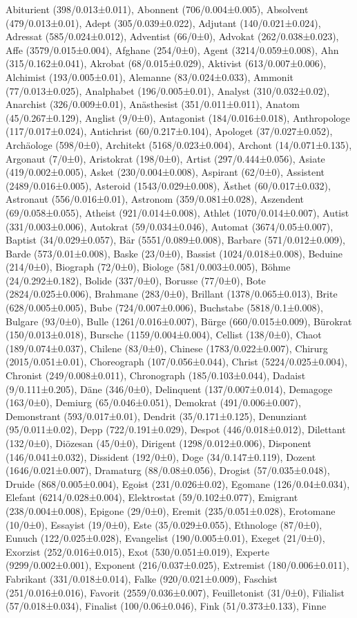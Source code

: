 \begin{styleMoutonText}
Abiturient (398/0.013±0.011), Abonnent (706/0.004±0.005), Absolvent (479/0.013±0.01), Adept (305/0.039±0.022), Adjutant (140/0.021±0.024), Adressat (585/0.024±0.012), Adventist (66/0±0), Advokat (262/0.038±0.023), Affe (3579/0.015±0.004), Afghane (254/0±0), Agent (3214/0.059±0.008), Ahn (315/0.162±0.041), Akrobat (68/0.015±0.029), Aktivist (613/0.007±0.006), Alchimist (193/0.005±0.01), Alemanne (83/0.024±0.033), Ammonit (77/0.013±0.025), Analphabet (196/0.005±0.01), Analyst (310/0.032±0.02), Anarchist (326/0.009±0.01), Anästhesist (351/0.011±0.011), Anatom (45/0.267±0.129), Anglist (9/0±0), Antagonist (184/0.016±0.018), Anthropologe (117/0.017±0.024), Antichrist (60/0.217±0.104), Apo\-loget (37/0.027±0.052), Archäologe (598/0±0), Architekt (5168/0.023±0.004), Archont (14/0.071±0.135), Argonaut (7/0±0), Aristokrat (198/0±0), Artist (297/0.444±0.056), Asiate (419/0.002±0.005), Asket (230/0.004±0.008), Aspirant (62/0±0), Assistent (2489/0.016±0.005), Asteroid (1543/0.029±0.008), Ästhet (60/0.017±0.032), Astronaut (556/0.016±0.01), Astronom (359/0.081±0.028), Aszendent (69/0.058±0.055), Atheist (921/0.014±0.008), Athlet (1070/0.014±0.007), Autist (331/0.003±0.006), Autokrat (59/0.034±0.046), Automat (3674/0.05±0.007), Baptist (34/0.029±0.057), Bär (5551/0.089±0.008), Barbare (571/0.012±0.009), Barde (573/0.01±0.008), Baske (23/0±0), Bassist (1024/0.018±0.008), Beduine (214/0±0), Biograph (72/0±0), Biologe (581/0.003±0.005), Böhme (24/0.292±0.182), Bolide (337/0±0), Borusse (77/0±0), Bote (2824/0.025±0.006), Brahmane (283/0±0), Brillant (1378/0.065±0.013), Brite (628/0.005±0.005), Bube (724/0.007±0.006), Buchstabe (5818/0.1±0.008), Bulgare (93/0±0), Bulle (1261/0.016±0.007), Bürge (660/0.015±0.009), Bürokrat (150/0.013±0.018), Bursche (1159/0.004±0.004), Cellist (138/0±0), Chaot (189/0.074±0.037), Chilene (83/0±0), Chinese (1783/0.022±0.007), Chirurg (2015/0.051±0.01), Choreograph (107/0.056±0.044), Christ (5224/0.025±0.004), Chronist (249/0.008±0.011), Chronograph (185/0.103±0.044), Dadaist (9/0.111±0.205), Däne (346/0±0), Delinquent (137/0.007±0.014), Demagoge (163/0±0), Demiurg (65/0.046±0.051), Demokrat (491/0.006±0.007), Demonstrant (593/0.017±0.01), Dendrit (35/0.171±0.125), Denunziant (95/0.011±0.02), Depp (722/0.191±0.029), Despot (446/0.018±0.012), Dilettant (132/0±0), Diözesan (45/0±0), Dirigent (1298/0.012±0.006), Disponent (146/0.041±0.032), Dissident (192/0±0), Doge (34/0.147±0.119), Dozent (1646/0.021±0.007), Dramaturg (88/0.08±0.056), Drogist (57/0.035±0.048), Druide (868/0.005±0.004), Egoist (231/0.026±0.02), Egomane (126/0.04±0.034), Elefant (6214/0.028±0.004), Elektrostat (59/0.102±0.077), Emigrant (238/0.004±0.008), Epigone (29/0±0), Eremit (235/0.051±0.028), Erotomane (10/0±0), Essayist (19/0±0), Este (35/0.029±0.055), Ethnologe (87/0±0), Eunuch (122/0.025±0.028), Evangelist (190/0.005±0.01), Exeget (21/0±0), Exorzist (252/0.016±0.015), Exot (530/0.051±0.019), Experte (9299/0.002±0.001), Exponent (216/0.037±0.025), Extremist (180/0.006±0.011), Fabrikant (331/0.018±0.014), Falke (920/0.021±0.009), Faschist (251/0.016±0.016), Favorit (2559/0.036±0.007), Feuilletonist (31/0±0), Filialist (57/0.018±0.034), Finalist (100/0.06±0.046), Fink (51/0.373±0.133), Finne 
\end{styleMoutonText}
